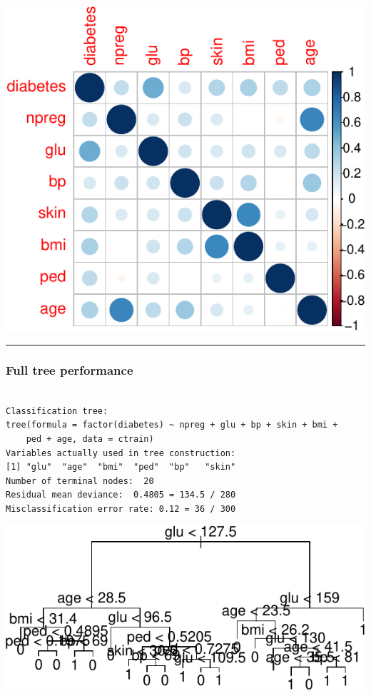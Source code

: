 \documentclass[
  letterpaper,
  DIV=11,
  numbers=noendperiod]{scrartcl}
\begin{document}
\includegraphics{L13_files/figure-pdf/unnamed-chunk-13-2.pdf}

\begin{center}\rule{0.5\linewidth}{0.5pt}\end{center}

\hypertarget{full-tree-performance}{%
\subsubsection{Full tree performance}\label{full-tree-performance}}

\begin{verbatim}

Classification tree:
tree(formula = factor(diabetes) ~ npreg + glu + bp + skin + bmi + 
    ped + age, data = ctrain)
Variables actually used in tree construction:
[1] "glu"  "age"  "bmi"  "ped"  "bp"   "skin"
Number of terminal nodes:  20 
Residual mean deviance:  0.4805 = 134.5 / 280 
Misclassification error rate: 0.12 = 36 / 300 
\end{verbatim}

\includegraphics{L13_files/figure-pdf/unnamed-chunk-14-1.pdf}
\end{document}
